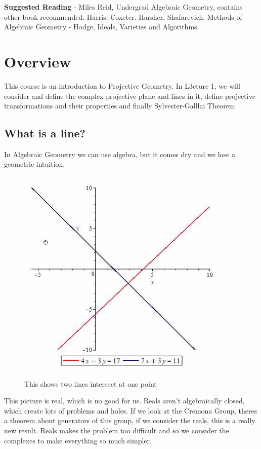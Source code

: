 \documentclass{article}
\begin{document}
  \maketitle

\textbf{Suggested Reading} - Miles Reid, Undergrad Algebraic Geometry, contains other book recommended. Harris. Coxeter. Harsher, Shafarevich, Methods of Algebraic Geometry - Hodge, Ideals, Varieties and Algorithms.\\

\section{Overview}
This course is an introduction to Projective Geometry. In L3cture 1, we will consider and define the complex projective plane and lines in it, define projective transformations and their properties and finally Sylvester-Galllai Theorem.

\subsection{What is a line?}
In Algebraic Geometry we can use algebra, but it comes dry and we lose a geometric intuition.
\begin{figure}[!ht]
\centering
\includegraphics{./figures/L1.1}
\caption{This shows two lines intersect at one point}
\end{figure}

This picture is real, which is no good for us. Reals aren't algebraically closed, which create lots of problems and holes. If we look at the Cremona Group, theres a theorem about generators of this group, if we consider the reals, this is a really new result. Reals makes the problem too difficult and so we consider the complexes to make everything so much simpler.\\
\end{document}
